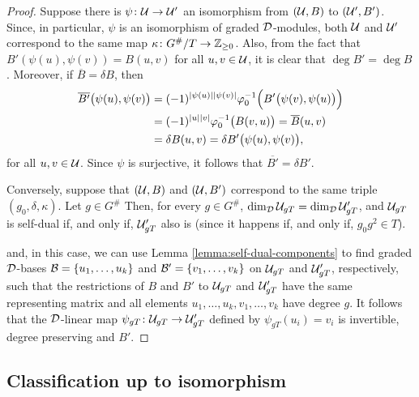 \begin{proof}
    Suppose there is $\psi\colon \mathcal U \to \mathcal U'$ an isomorphism from $(\mathcal U, B)$ to $(\mathcal U', B')$. Since, in particular, $\psi$ is an isomorphism of graded $\mathcal{D}$-modules, both $\mathcal U$ and $\mathcal U'$ correspond to the same map $\kappa\colon G^\#/T \to \mathbb{Z}_{\geq 0}$. 
    Also, from the fact that $B'(\psi(u), \psi(v)) = B(u, v)$ for all $u, v\in \mathcal U$, it is clear that $\deg B' = \deg B$.
    Moreover, if $\overline{B} = \delta B$, then
    \begin{align*}
        \overline{B'} \big(\psi(u), \psi(v) \big) &= (-1)^{|\psi(u)||\psi(v)|} \varphi_0^{-1} \Big( B'\big( \psi(v) , \psi(u) \big) \Big) \\
        &= (-1)^{|u||v|} \varphi_0^{-1} \big( B(v, u) \big) 
        = \overline{B} (u, v) \\
        &= \delta B(u, v) = \delta B' \big( \psi(u), \psi(v) \big),
    \end{align*}
    for all $u, v \in \mathcal U$. 
    Since $\psi$ is surjective, it follows that $\overline{B'} = \delta B'$. 
    
    Conversely, suppose that $(\mathcal U, B)$ and $(\mathcal U, B')$ correspond to the same triple $(g_0, \delta, \kappa)$. 
    Let $g\in G^\#$
    Then, for every $g \in G^\#$, $\dim_{\mathcal{D}} \mathcal U_{gT} = \dim_{\mathcal{D}} \mathcal U'_{gT}$, and $\mathcal U_{gT}$ is self-dual if, and only if, $\mathcal U'_{gT}$ also is (since it happens if, and only if, $g_0 g^2 \in T$).
    
    and, in this case, we can use Lemma \ref{lemma:self-dual-components} to find graded $\mathcal{D}$-bases $\mathcal B = \{u_1, \ldots, u_k\}$ and $\mathcal B' = \{v_1, \ldots, v_k\}$ on $\mathcal U_{gT}$ and $\mathcal U'_{gT}$, respectively, such that the restrictions of $B$ and $B'$ to $\mathcal U_{gT}$ and $\mathcal U'_{gT}$ have the same representing matrix and all elements $u_1, \ldots, u_k, v_1, \ldots, v_k$ have degree $g$. 
    It follows that the $\mathcal{D}$-linear map $\psi_{gT} \colon \mathcal U_{gT} \to \mathcal U'_{gT}$ defined by $\psi_{gT} (u_i) = v_i$ is invertible, degree preserving and $B'$.
\end{proof}


\subsection{Classification up to isomorphism}

